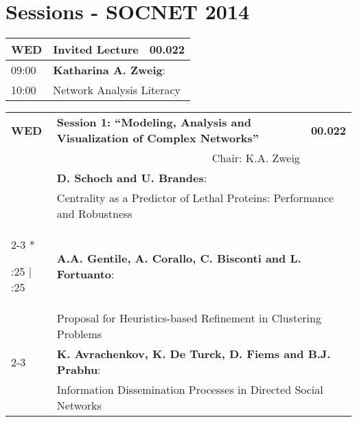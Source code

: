 \section{\textcolor{unibablueI}{Sessions - SOCNET 2014}}
\footnotesize
%
\newcommand\VertEntry[1]{%
  \multirow{3}*{%
    \begin{varwidth}{2em}%
    \centering #1%
    \end{varwidth}}}
%
\begin{longtable}{|p{2em}|p{5.5cm}|p{1cm}|}
\hline
\rowcolor{unibayellowV} \textcolor{unibablueI}{\textbf{WED}} & \textcolor{unibablueI}{\textbf{Invited Lecture}} & \textcolor{unibablueI}{\textbf{00.022}}\\
\hline
\endhead
09:00 & \multicolumn{2}{p{6.5cm}|}{\textbf{Katharina A. Zweig}:} \\
10:00 & \multicolumn{2}{p{6.5cm}|}{Network Analysis Literacy} \\
 \hline
\end{longtable}
\vspace{-2em}
\begin{longtable}{|p{2em}|p{5.5cm}|p{1cm}|}
\hline
\rowcolor{unibablueV} \textcolor{unibablueI}{\textbf{WED}} & \textcolor{unibablueI}{\textbf{Session 1: ``Modeling, Analysis and Visualization of Complex Networks''}} & \textcolor{unibablueI}{\textbf{00.022}}\\
\rowcolor{unibablueV} & \multicolumn{1}{r|}{\textcolor{unibablueI}{Chair: K.A. Zweig}} &\\
\hline
\endhead
 & \multicolumn{2}{p{6.5cm}|}{\textbf{D. Schoch and U. Brandes}:} \\
 & \multicolumn{2}{p{6.5cm}|}{Centrality as a Predictor of Lethal Proteins: Performance and Robustness} \\
 \cline{2-3}
\VertEntry{10:25 \qquad\quad $\vert$ \qquad 11:25} & \multicolumn{2}{p{6.5cm}|}{\textbf{A.A. Gentile, A. Corallo, C. Bisconti and L. Fortuanto}:} \\
 & \multicolumn{2}{p{6.5cm}|}{Proposal for Heuristics-based Refinement in Clustering Problems} \\
  \cline{2-3}
 & \multicolumn{2}{p{6.5cm}|}{\textbf{K. Avrachenkov, K. De Turck, D. Fiems and B.J. Prabhu}:} \\
 & \multicolumn{2}{p{6.5cm}|}{Information Dissemination Processes in Directed Social Networks} \\

 \hline
\end{longtable}
